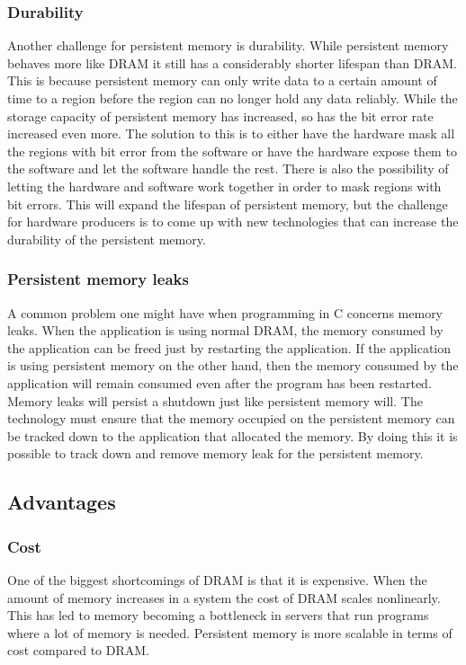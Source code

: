 \documentclass[12pt,a4paper,USenglish]{article}      %
\begin{document}
\subsubsection{Durability}
Another challenge for persistent memory is durability. While persistent memory behaves more like DRAM it still has a considerably shorter lifespan than DRAM\cite{Badam}. This is because persistent memory can only write data to a certain amount of time to a region before the region can no longer hold any data reliably. While the storage capacity of persistent memory has increased, so has the bit error rate increased even more. The solution to this is to either have the hardware mask all the regions with bit error from the software or have the hardware expose them to the software and let the software handle the rest. There is also the possibility of letting the hardware and software work together in order to mask regions with bit errors. This will expand the lifespan of persistent memory, but the challenge for hardware producers is to come up with new technologies that can increase the durability of the persistent memory.

\subsubsection{Persistent memory leaks}
A common problem one might have when programming in C concerns memory leaks. When the application is using normal DRAM, the memory consumed by the application can be freed just by restarting the application. If the application is using persistent memory on the other hand, then the memory consumed by the application will remain consumed even after the program has been restarted.\cite{Volos}\cite{Swanson} Memory leaks will persist a shutdown just like persistent memory will. The technology must ensure that the memory occupied on the persistent memory can be tracked down to the application that allocated the memory. By doing this it is possible to track down and remove memory leak for the persistent memory.

\subsection{Advantages}
\subsubsection{Cost}
One of the biggest shortcomings of DRAM is that it is expensive. When the amount of memory increases in a system the cost of DRAM scales nonlinearly.\cite{Badam} This has led to memory becoming a bottleneck in servers that run programs where a lot of memory is needed. Persistent memory is more scalable in terms of cost compared to DRAM. 
\end{document}
